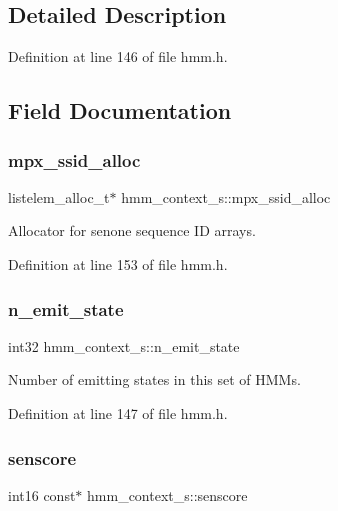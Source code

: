 \subsection{Detailed Description}


Definition at line 146 of file hmm.\+h.



\subsection{Field Documentation}
\mbox{\label{structhmm__context__s_a63486d186a984a87d060064e65fab564}} 
\subsubsection{mpx\+\_\+ssid\+\_\+alloc}
{\footnotesize\ttfamily listelem\+\_\+alloc\+\_\+t$\ast$ hmm\+\_\+context\+\_\+s\+::mpx\+\_\+ssid\+\_\+alloc}



Allocator for senone sequence ID arrays. 



Definition at line 153 of file hmm.\+h.

\mbox{\label{structhmm__context__s_a27ba4c5db11110bddf240dd52ed36084}} 
\subsubsection{n\+\_\+emit\+\_\+state}
{\footnotesize\ttfamily int32 hmm\+\_\+context\+\_\+s\+::n\+\_\+emit\+\_\+state}



Number of emitting states in this set of H\+M\+Ms. 



Definition at line 147 of file hmm.\+h.

\mbox{\label{structhmm__context__s_a1cca9eb94bc20d9c5e60f2da18074397}} 
\subsubsection{senscore}
{\footnotesize\ttfamily int16 const$\ast$ hmm\+\_\+context\+\_\+s\+::senscore}



